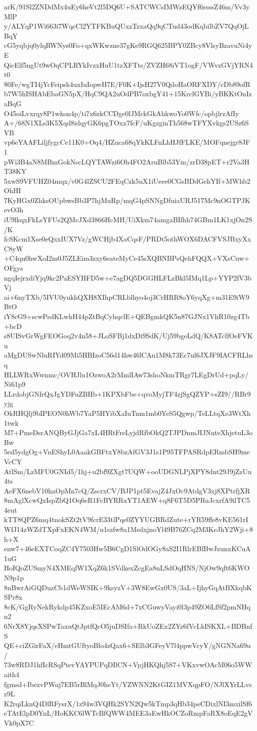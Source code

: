 arK/91Sl2ZNDdMx4uEy6heVt2l5DQ6U+SATCWCsIMWzEQYf6rsssZ46m/Vv3yMlP
y/ALYqP1Wi663i7WqcCl2YTFKBuQUxzTzxaQq9qCTud43odKqbilbZV7QqOjLBqY
cG5yqbjq0ylqRWNys0Fo+qxWKwzne37gKe9RGQ625BPY0ZBcy8VlsyBzavuNi4yE
QicElf5ngUt9wOqCPLRYkIvzxHuU1tzXFTts/ZVZH68iVT1ogF/VWvzGVjYRN4t0
80Fe/wgTI4jYcFeipsk4uxIuIopwH7E/F0K+IjsH27V0QdoHaORFXDY/cDb89ofR
b7W5hISHAbEbaGN5pX/HqC9QA2uOdPB7oxbgY41+15KrclGYBi/yBKKtOnIzaBqG
O45oiLvxrqy8P1wkon4p/ti7x6zkCCDge0lJMckGkAhkwoYo0Wfc/opbjlrzAfIy
A+/68N1XLs3K5Xqd8idqyGK6pgTOxx7fcF/uKgzginTh568wTFYXvkgs2USz6SVB
vp6eYAAFLiljfygcCe11K0+Oq4/HZuca68qYkKLFnLhHJfFLKE/MOFqnejgr8JF1
pWi3B4aN8MBmGokNscLQYTAWzi6Oh4FO2AruBlb53Ym/zrD38pET+r2Va3HT38KY
5xwS9VFUHZ04mqx/v0G4lZSCU2FEqCzk5uX1iUeee0CGsBDdGehYIf+MWhb2OhHI
7KyHGx0ZhksOUpbwsBb3P7hjMuRp/mqG4pSNNgDfuiaURJ517Mc9nOGTPJKevO3h
iU9lkqxFkLsYFUs2QMcJXd3866HcMH/UiXkm74amgaBIfhh74GBm1LK1xjOn2S/K
fcSKcm1Xse0eQxxIUX7Vz/gWCHjb4XaCqsF/PRDt5othWOX6DACFVSJBxyXxC8yW
+C4qn0hwXoI2m0J5ZLEim3zxy6eateMyCe45sXQBNBPsQehFQQX+VXsCuw+OFgys
ngqIejrxdiYjq9kc2PaESYHFD5w+e7agDQ5DGGHLFLzBkl5IMq1Lp+YYP2fV3bVj
ai+6nyTXb/5IVU0yukhQXH8XIhpCRLblhyo4oj3CrHRR8oY6yqXg+m31E9iW9BtO
iY8cG9+scwPsdKLwhH44pZtBqCyhqcfE+QEBgmkQK5n87GJNx1VhR10zg4Tb+bcD
s8UISvGrWgFEOGoq2v4n58+JLoSFBj1dxDi9SdK/Uj59bgeLdQ/K8ATclfOeFVKu
aMgDUSwNluRIYd09Mi5HBIzoC56d14hw46lCAu1M8k73Ec7ul6JXJF9IACFRLhsq
HLLWRxWwnmc/OVHJlu1OzwoA2rMmlIAw73shoNkmTRgr7LEgDrUd+pqLy/Ni61p9
LLrdobjGNfrQxJgYDFuZBHb+1KPXbFbe+qvoMyjTF4zjSgQZYP+sZI9//RBr9yjg
OkRHQlj9bIPEON0hWb7YaP5HYibXaIuTnm1mb0YeS5Qgwp/TeLLtqXe3WtXh1twk
M7+PmeDsrANQByGJjGa7xL4HRtFreLyjdRfbOkQ2TJPDnmJIJNnteXhjetuL3oBw
5ed5ydgOg+VuEShyL0AaakGBFtxY8bzAfGV3J1s1P95TFPASRdpERmbSH9meVcCY
AtlSm/LzMFU0GNId5/1hj+u2bf9ZXgt7UQW+ooUDGNLPjXPY8dnt29J9jZzUu4ts
AeFX6nebV10haOpMn7cQ/ZscrxCV/BJP1pt5EvajZ4JxOc9AtdgV3xj8XPtrfjXR
8mAglXcwQxIspZbQ1Oq6eR1FcBYRRxYT1AEW+q8F6T5D5PRuJcxrfA9ilTC54eut
kTT8QPZ6mq4tnokSZt2tV9fcrE33tlPqe0ZYYUGBRdZute+rYR59ffe8vKE561rI
WfJ14zWZdTXpFxEKN4WM/u1szfw8a1MsdxjnoYl49B76ZCq2M3KeJhY2Wji+8h+X
enw7+46eEXTCoqZC4Y7503Hw5B6CgD1SlOdOGy8aS2I1RlrEBlBwJzunxKCuA1uG
HoIQoZUSmyN4XMEqfW1XqZ6k1SVdkexZcgEa8nLSdOqHNS/NjOw9qft6KWON9p1p
8nBwrAiGQDuzCb1dWeWSIK+9ksyzV+3W8EwGx0US/3aL+IjhyGqAtBXkqbKSPr8x
8cK/GgRyNekRykdp45KZxoE5IEcAM6d+7xCGuwyVayi0l3p49ZO6LfSf2pmNHqn2
6NrX8YjqsXSPwTaxuQtJptfQcO5juDSIfa+RkUoZEx2ZYz6fVcLkISKXL+BDBnfS
QE+ciZGirFaX/eHmtGUftyoBlo4zQax6+SElb3GFeyV7l4ppwVcyY/gNGNNa69u/
73w8RDJ1hfIcRSqPtevYAYPUPqDIlCN+VpjHKQhj5S7+VKxvwOAcM06o5WWaith4
fgmsd+IbezvPWuj7EB5rBlMqJ0heYt/YZWNN2KtGIZ1MVXqpFO/NJlXYrLLvsz9L
K2rqiLknQ4DlRFysrX/1z94w3VQHk2SYN2Qw5kTmp3qHb34peCDixlNI3mxilSf6
eTAtElpD0YnL/HoKKC6lWTcBfQWW4MEE3aEwHkOCZoRmpFaRX8oEqE2gVVk0pX7C
